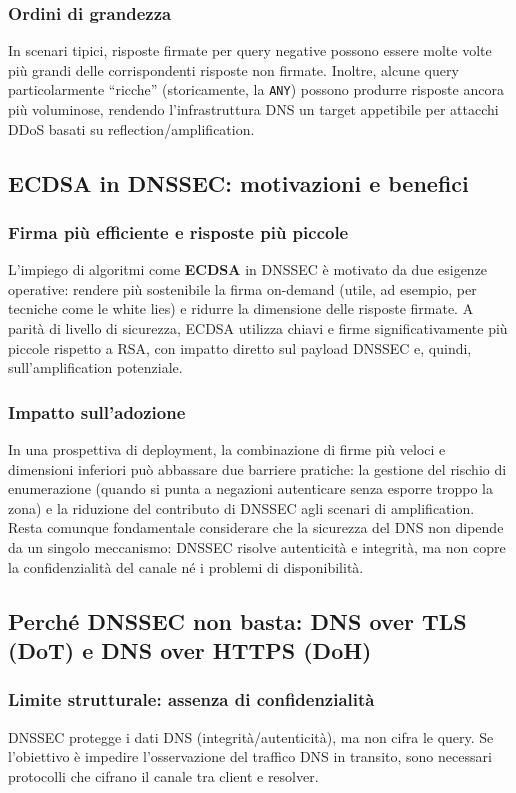 \subsubsection{Ordini di grandezza}
In scenari tipici, risposte firmate per query negative possono essere molte volte più grandi delle corrispondenti risposte non firmate. Inoltre, alcune query particolarmente “ricche” (storicamente, la \texttt{ANY}) possono produrre risposte ancora più voluminose, rendendo l’infrastruttura DNS un target appetibile per attacchi DDoS basati su reflection/amplification.

\subsection{ECDSA in DNSSEC: motivazioni e benefici}

\subsubsection{Firma più efficiente e risposte più piccole}
L’impiego di algoritmi come \textbf{ECDSA} in DNSSEC è motivato da due esigenze operative: rendere più sostenibile la firma on-demand (utile, ad esempio, per tecniche come le white lies) e ridurre la dimensione delle risposte firmate. A parità di livello di sicurezza, ECDSA utilizza chiavi e firme significativamente più piccole rispetto a RSA, con impatto diretto sul payload DNSSEC e, quindi, sull’amplification potenziale.

\subsubsection{Impatto sull’adozione}
In una prospettiva di deployment, la combinazione di firme più veloci e dimensioni inferiori può abbassare due barriere pratiche: la gestione del rischio di enumerazione (quando si punta a negazioni autenticare senza esporre troppo la zona) e la riduzione del contributo di DNSSEC agli scenari di amplification. Resta comunque fondamentale considerare che la sicurezza del DNS non dipende da un singolo meccanismo: DNSSEC risolve autenticità e integrità, ma non copre la confidenzialità del canale né i problemi di disponibilità.

\subsection{Perché DNSSEC non basta: DNS over TLS (DoT) e DNS over HTTPS (DoH)}

\subsubsection{Limite strutturale: assenza di confidenzialità}
DNSSEC protegge i dati DNS (integrità/autenticità), ma non cifra le query. Se l’obiettivo è impedire l’osservazione del traffico DNS in transito, sono necessari protocolli che cifrano il canale tra client e resolver.

